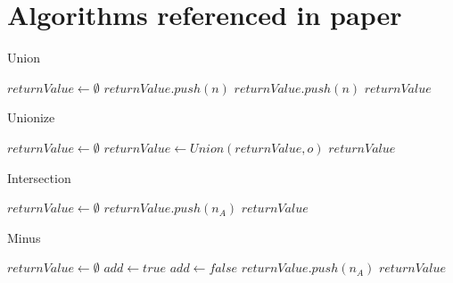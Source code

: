 \chapter{Algorithms referenced in paper}

\begin{algorithm}[htb]
    \centering
	\caption{Union}\label{Union}
	\begin{algorithmic}[1]
		\State $returnValue \gets \emptyset$ 
		\State $returnValue.push(n)$
		\EndIf
		\EndFor
		\State $returnValue.push(n)$
		\EndIf
		\EndFor
		\State \Return $returnValue$ 
		\EndFunction
	\end{algorithmic}
\end{algorithm}

\begin{algorithm}[htb]
    \centering
	\caption{Unionize}\label{Unionize}
	\begin{algorithmic}[1]
		\State $returnValue \gets \emptyset$ 
		\State $returnValue \gets Union(returnValue,o)$
		\EndFor
		\State \Return $returnValue$ 
		\EndFunction
	\end{algorithmic}
\end{algorithm}

\begin{algorithm}[htb]
    \centering
	\caption{Intersection}\label{Intersection}
	\begin{algorithmic}[1]
		\State $returnValue \gets \emptyset$ 
		\State $returnValue.push(n_A)$
		\EndIf
		\EndFor
		\EndFor
		\State \Return $returnValue$ 
		\EndFunction
	\end{algorithmic}
\end{algorithm}


\begin{algorithm}[htb]
    \centering
	\caption{Minus}\label{Minus}
	\begin{algorithmic}[1]
		\State $returnValue \gets \emptyset$
		\State $add \gets true$
		\State $add \gets false$
		\EndIf
		\EndFor
		\State $returnValue.push(n_A)$
		\EndIf
		\EndFor
		\State \Return $returnValue$
		\EndFunction
	\end{algorithmic}
\end{algorithm}

